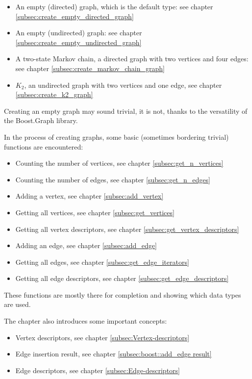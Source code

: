 \begin{itemize}
  \item An empty (directed) graph, which is the default type: 
    see chapter \ref{subsec:create_empty_directed_graph}
  \item An empty (undirected) graph: 
    see chapter \ref{subsec:create_empty_undirected_graph}
  \item A two-state Markov chain, a directed graph with two vertices 
    and four edges:
    see chapter \ref{subsec:create_markov_chain_graph}
  \item $K_{2}$, an undirected graph with two vertices and one edge, 
    see chapter \ref{subsec:create_k2_graph}
\end{itemize}


Creating an empty graph may sound trivial, it is not, thanks to the versatility
of the Boost.Graph library.

In the process of creating graphs, some basic (sometimes bordering trivial)
functions are encountered:

\begin{itemize}
  \item Counting the number of vertices, 
    see chapter \ref{subsec:get_n_vertices}
  \item Counting the number of edges,
     see chapter \ref{subsec:get_n_edges}
  \item Adding a vertex,
     see chapter \ref{subsec:add_vertex}
  \item Getting all vertices,
     see chapter \ref{subsec:get_vertices}
  \item Getting all vertex descriptors,
     see chapter \ref{subsec:get_vertex_descriptors}
  \item Adding an edge,
     see chapter \ref{subsec:add_edge}
  \item Getting all edges,
    see chapter \ref{subsec:get_edge_iterators}
  \item Getting all edge descriptors,
    see chapter \ref{subsec:get_edge_descriptors}
\end{itemize}

These functions are mostly there for completion and showing which data types
are used.

The chapter also introduces some important concepts:

\begin{itemize}
  \item Vertex descriptors,
    see chapter \ref{subsec:Vertex-descriptors}
  \item Edge insertion result,
    see chapter \ref{subsec:boost::add_edge result}
  \item Edge descriptors,
    see chapter \ref{subsec:Edge-descriptors}
\end{itemize}

